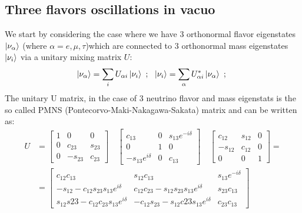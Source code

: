 \documentclass[12pt,a4paper,openright,twoside]{report}
\begin{document}
\subsection{Three flavors oscillations in vacuo}
We start by considering the case where we have 3 orthonormal flavor eigenstates $\ket{\nu_\alpha}$  (where $\alpha = e, \mu, \tau$)which are connected to 3 orthonormal mass eigenstates $\ket{\nu_i}$ via a unitary mixing matrix $U$:
\begin{equation}
\label{mix:eq}
\ket{\nu_\alpha}=\sum_i U_{\alpha i} \ket{\nu_i} \text{ ;   } \ \ket{\nu_i}=\sum_\alpha U_{\alpha i}^* \ket{\nu_\alpha} \text{ ;  }
\end{equation}
The unitary U matrix, in the case of 3 neutrino flavor and mass eigenstats is the so called PMNS (Pontecorvo-Maki-Nakagawa-Sakata) matrix and can be written as:
\begin{equation}
\begin{split}
U & =
\begin{bmatrix}
1 & 0 & 0 \\
0 & c_{23} & s_{23} \\
0 & -s_{23} & c_{23}
\end{bmatrix}
\quad
\begin{bmatrix}
c_{13} & 0 & s_{13}e^{-i\delta} \\
0 & 1 & 0 \\
-s_{13}e^{i\delta} & 0 & c_{13}
\end{bmatrix}
\quad
\begin{bmatrix}
c_{12} & s_{12} & 0 \\
-s_{12} & c_{12} & 0 \\
0 & 0 & 1
\end{bmatrix} = \\[8pt]
& =
\begin{bmatrix}
c_{12}c_{13} & s_{12}c_{13} & s_{13}e^{-i\delta} \\
-s_{12}-c_{12}s_{23}s_{13}e^{i\delta} & c_{12}c_{23}-s_{12}s_{23}s_{13}e^{i\delta} & s_{23}c_{13} \\
s_{12}s{23}-c_{12}c_{23}s_{13}e^{i\delta} & -c_{12}s_{23}-s_{12}c{23}s_ {13}e^{i\delta} & c_{23}c_{13}
\end{bmatrix}
\end{split}
\end{equation}
\end{document}
